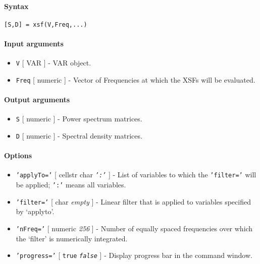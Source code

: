 


	\paragraph{Syntax}\label{syntax}

\begin{verbatim}
[S,D] = xsf(V,Freq,...)
\end{verbatim}

\paragraph{Input arguments}\label{input-arguments}

\begin{itemize}
\item
  \texttt{V} {[} VAR {]} - VAR object.
\item
  \texttt{Freq} {[} numeric {]} - Vector of Frequencies at which the
  XSFs will be evaluated.
\end{itemize}

\paragraph{Output arguments}\label{output-arguments}

\begin{itemize}
\item
  \texttt{S} {[} numeric {]} - Power spectrum matrices.
\item
  \texttt{D} {[} numeric {]} - Spectral density matrices.
\end{itemize}

\paragraph{Options}\label{options}

\begin{itemize}
\item
  \texttt{'applyTo='} {[} cellstr \textbar{} char \textbar{}
  \emph{\texttt{':'}} {]} - List of variables to which the
  \texttt{'filter='} will be applied; \texttt{':'} means all variables.
\item
  \texttt{'filter='} {[} char \textbar{} \emph{empty} {]} - Linear
  filter that is applied to variables specified by `applyto'.
\item
  \texttt{'nFreq='} {[} numeric \textbar{} \emph{256} {]} - Number of
  equally spaced frequencies over which the `filter' is numerically
  integrated.
\item
  \texttt{'progress='} {[} \texttt{true} \textbar{}
  \emph{\texttt{false}} {]} - Display progress bar in the command
  window.
\end{itemize}

